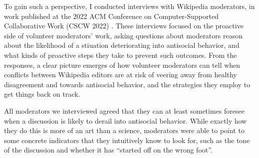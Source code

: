 \documentclass[11pt,letterpaper]{article}
\begin{document}
To gain such a perspective, I conducted interviews with Wikipedia moderators, in work published at the 2022 ACM Conference on Computer-Supported Collaborative Work (CSCW 2022) \cite{schluger_proactive_2022}.
These interviews focused on the proactive side of volunteer moderators' work, asking questions about moderators reason about the likelihood of a stiuation deteriorating into antisocial behavior, and what kinds of proactive steps they take to prevent such outcomes.
From the responses, a clear picture emerges of how volunteer moderators can tell when conflicts between Wikipedia editors are at risk of veering away from healthy disagreement and towards antisocial behavior, and the strategies they employ to get things back on track.

All moderators we interviewed agreed that they can at least sometimes foresee when a discussion is likely to derail into antisocial behavior.
While exactly how they do this is more of an art than a science, moderators were able to point to some concrete indicators that they intuitively know to look for, such as the tone of the discussion and whether it has ``started off on the wrong foot''.

\vspace{\baselineskip}


\end{document}
